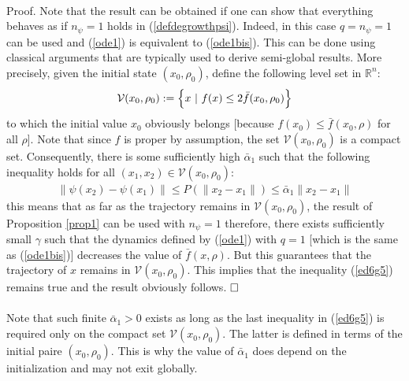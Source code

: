 \documentclass{article}
\begin{document}
\ \\
{\sc Proof}. Note that the result  can be obtained if one can show that everything behaves as if $n_\psi=1$ holds in (\ref{defdegrowthpsi}). Indeed, in this case $q=n_\psi=1$ can be used and (\ref{ode1}) is equivalent to (\ref{ode1bis}). This can be done using classical arguments that are typically used to derive semi-global results. More precisely, given the initial state $(x_0,\rho_0)$, define the following level set in $\mathbb{R}^{n}$:
\begin{eqnarray}
\mathcal V(x_0,\rho_0):=\Bigl\{x\ \vert \ f(x)\le 2\bar f(x_0,\rho_0)\Bigr\}
\end{eqnarray}
to which the initial value $x_0$ obviously belongs [because $f(x_0)\le \bar f(x_0,\rho)$ for all $\rho$]. Note that since $f$ is proper by assumption, the set $\mathcal V(x_0,\rho_0)$ is a compact set. Consequently, there is some sufficiently high $\bar\alpha_1$ such that the following inequality holds for all $(x_1,x_2)\in \mathcal V(x_0,\rho_0)$:
\begin{eqnarray}
\|\psi(x_2)-\psi(x_1)\|\le P(\|x_2-x_1\|)\le \bar\alpha_1\|x_2-x_1\| \label{ed6g5} 
\end{eqnarray} 
this means that as far as the trajectory remains in $\mathcal V(x_0,\rho_0)$, the result of Proposition \ref{prop1} can be used with $n_\psi=1$ therefore, there exists sufficiently small $\gamma$ such that the dynamics defined by (\ref{ode1}) with $q=1$ [which is the same as (\ref{ode1bis})] decreases the value of $\bar f(x,\rho)$. But this guarantees that the trajectory of $x$ remains in $\mathcal V(x_0,\rho_0)$. This implies that the inequality (\ref{ed6g5}) remains true and the result obviously follows. $\hfill \Box$     \ \\ \ \\ 
Note that such finite $\bar\alpha_1>0$ exists as long as the last inequality in (\ref{ed6g5}) is required only on the compact set $\mathcal V(x_0,\rho_0)$. The latter is defined in terms of the initial paire $(x_0,\rho_0)$. This is why the value of $\bar\alpha_1$ does depend on the initialization and may not exit globally. 
\end{document}
